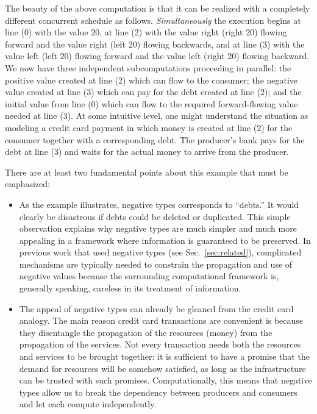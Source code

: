 \documentclass[preprint]{sigplanconf}
\begin{document}
The beauty of the above computation is that it can be realized with a
completely different concurrent schedule as follows. \emph{Simultaneously}
the execution begins at line (0) with the value {{20}}, at line (2) with the
value {{right (right 20)}} flowing forward and the value {{right (left 20)}}
flowing backwards, and at line (3) with the value {{left (left 20)}} flowing
forward and the value {{left (right 20)}} flowing backward. We now have three
independent subcomputations proceeding in parallel: the positive value
created at line (2) which can flow to the consumer; the negative value
created at line (3) which can pay for the debt created at line (2); and the
initial value from line (0) which can flow to the required forward-flowing
value needed at line (3). At some intuitive level, one might understand the
situation as modeling a credit card payment in which money is created at line
(2) for the consumer together with a corresponding debt. The producer's bank
pays for the debt at line (3) and waits for the actual money to arrive from
the producer.

There are at least two fundamental points about this example that must be
emphasized:
\begin{itemize}
\item As the example illustrates, negative types corresponds to ``debts.''
  It would clearly be disastrous if debts could be deleted or
  duplicated. This simple observation explains why negative types are much
  simpler and much more appealing in a framework where information is
  guaranteed to be preserved. In previous work that used negative types (see
  Sec.~\ref{sec:related}), complicated mechanisms are typically needed to
  constrain the propagation and use of negative values because the
  surrounding computational framework is, generally speaking, careless in its
  treatment of information.
\item The appeal of negative types can already be gleaned from the credit
  card analogy. The main reason credit card transactions are convenient is
  because they disentangle the propagation of the resources (money) from the
  propagation of the services. Not every transaction needs both the resources
  and services to be brought together: it is sufficient to have a promise
  that the demand for resources will be somehow satisfied, as long as the
  infrastructure can be trusted with such promises. Computationally, this
  means that negative types allow us to break the dependency between
  producers and consumers and let each compute independently.
\end{itemize}
\end{document}

